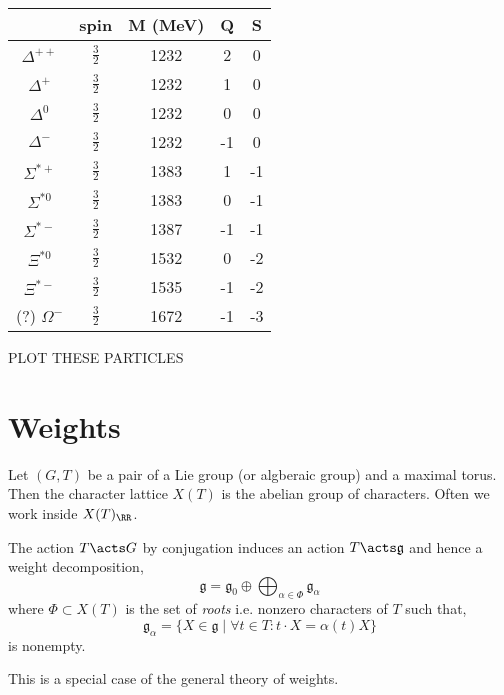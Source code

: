 \documentclass[12pt]{article}
\begin{document}
\begin{center}
\begin{tabular}{||c | c c c c ||} 
 \hline
 & spin & M (MeV) & Q & S \\ [0.5ex] 
 \hline\hline
$\Delta^{++}$ & $\tfrac{3}{2}$ & 1232 & 2 & 0 \\ 
 \hline
$\Delta^{+}$ & $\tfrac{3}{2}$ & 1232 & 1 & 0 \\ 
 \hline
$\Delta^{0}$ & $\tfrac{3}{2}$ & 1232 & 0 & 0 \\ 
 \hline
$\Delta^{-}$ & $\tfrac{3}{2}$ & 1232 & -1 & 0 \\ 
 \hline
$\Sigma^{* +}$ & $\tfrac{3}{2}$ & 1383 & 1 & -1 \\ 
 \hline
$\Sigma^{* 0}$ & $\tfrac{3}{2}$ & 1383 & 0 & -1 \\ 
 \hline
$\Sigma^{* -}$ & $\tfrac{3}{2}$ & 1387 & -1 & -1 \\ 
 \hline
$\Xi^{*0}$ & $\tfrac{3}{2}$ & 1532 & 0 & -2 \\ 
 \hline
$\Xi^{*-}$ & $\tfrac{3}{2}$ & 1535 & -1 & -2 \\ 
 \hline
(?) $\Omega^{-}$ & $\tfrac{3}{2}$ & 1672 & -1 & -3 \\ 
 \hline
\end{tabular}
\end{center}


PLOT THESE PARTICLES

\section{Weights}

\newcommand{\g}{\mathfrak{g}}
\newcommand{\h}{\mathfrak{h}}
\newcommand{\ad}{\mathrm{ad}}

Let $(G, T)$ be a pair of a Lie group (or algberaic group) and a maximal torus. Then the character lattice $X(T)$ is the abelian group of characters. Often we work inside $X(T)_{\RR}$. 

\begin{defn}
The action $T \acts G$ by conjugation induces an action $T \acts \g$ and hence a weight decomposition,
\[ \g = \g_0 \oplus \bigoplus_{\alpha \in \Phi} \g_\alpha \]
where $\Phi \subset X(T)$ is the set of \textit{roots} i.e. nonzero characters of $T$ such that,
\[ \g_\alpha = \{ X \in \g \mid \forall t \in T : t \cdot X = \alpha(t) X \} \]
is nonempty.
\end{defn}

This is a special case of the general theory of weights. 
\end{document}
